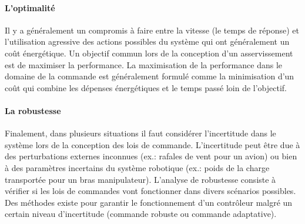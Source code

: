 \paragraph{L'optimalité} 

Il y a généralement un compromis à faire entre la vitesse (le temps de réponse) et l'utilisation agressive des actions possibles du système qui ont généralement un coût énergétique. Un objectif commun lors de la conception d'un asservissement est de maximiser la performance. La maximisation de la performance dans le domaine de la commande est généralement formulé comme la minimisation d'un coût qui combine les dépenses énergétiques et le temps passé loin de l'objectif.

\paragraph{La robustesse} Finalement, dans plusieurs situations il faut considérer l'incertitude dans le système lors de la conception des lois de commande. L'incertitude peut être due à des perturbations externes inconnues (ex.: rafales de vent pour un avion) ou bien à des paramètres incertains du système robotique (ex.: poids de la charge transportée pour un bras manipulateur). L'analyse de robustesse consiste à vérifier si les lois de commandes vont fonctionner dans divers scénarios possibles. Des méthodes existe pour garantir le fonctionnement d'un contrôleur malgré un certain niveau d'incertitude (commande robuste ou commande adaptative).

